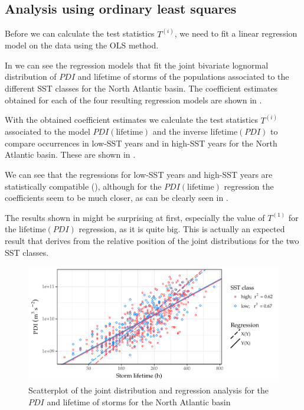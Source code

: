 \subsection{Analysis using ordinary least squares}\label{sec:reg-analysis-data}

Before we can calculate the test statistics $T^{(i)}$, we need to fit a linear regression model on the data using the OLS method.

In  we can see the regression models that fit the joint bivariate lognormal distribution of $PDI$ and lifetime of storms of the populations associated to the different SST classes for the North Atlantic basin. The coefficient estimates obtained for each of the four resulting regression models are shown in .

With the obtained coefficient estimates we calculate the test statistics $T^{(i)}$associated to the model $PDI(\text{lifetime})$ and the inverse $\text{lifetime}(PDI)$ to compare occurrences in low-SST years and in high-SST years for the North Atlantic basin. These are shown in .

\medskip
We can see that the regressions for low-SST years and high-SST years are statistically compatible (), although for the $PDI(\text{lifetime})$ regression the coefficients seem to be much closer, as can be clearly seen in .

The results shown in  might be surprising at first, especially the value of $T^{(1)}$ for the $\text{lifetime}(PDI)$ regression, as it is quite big. This is actually an expected result that derives from the relative position of the joint distributions for the two SST classes.

\begin{figure}[H]
	\centering
	\includegraphics[width=\textwidth]{images/scatterplot-natl}
	\caption{Scatterplot of the joint distribution and regression analysis for the $PDI$ and lifetime of storms for the North Atlantic basin}
	\label{fig:natl-scatterplot}
\end{figure}

